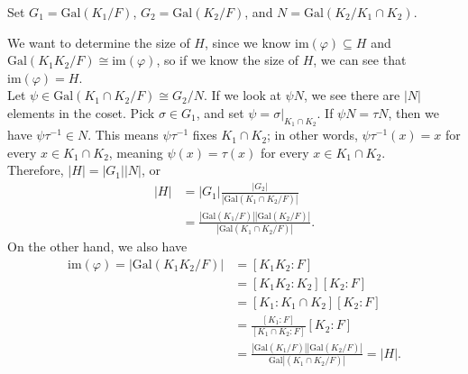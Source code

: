 \documentclass[10pt]{extarticle}
\begin{document}
  Set $G_1 = \text{Gal}(K_1/F)$, $G_2 = \text{Gal}(K_2/F)$, and $N = \text{Gal}(K_2/K_1\cap K_2)$.
  \begin{center}
  \end{center}
  We want to determine the size of $H$, since we know $\text{im}(\varphi)\subseteq H$ and $\text{Gal}(K_1K_2/F)\cong \text{im}(\varphi)$, so if we know the size of $H$, we can see that $\text{im}(\varphi) = H$.\\

  Let $\psi\in \text{Gal}(K_1\cap K_2/F) \cong G_2/N$. If we look at $\psi N$, we see there are $|N|$ elements in the coset. Pick $\sigma\in G_1$, and set $\psi = \sigma|_{K_1\cap K_2}$. If $\psi N = \tau N$, then we have $\psi \tau^{-1}\in N$. This means $\psi \tau^{-1}$ fixes $K_1\cap K_2$; in other words, $\psi\tau^{-1}(x) = x$ for every $x\in K_1\cap K_2$, meaning $\psi(x) = \tau(x)$ for every $x\in K_1\cap K_2$.\\

  Therefore, $|H| = |G_1||N|$, or
  \begin{align*}
    |H| &= |G_1| \frac{|G_2|}{|\text{Gal}(K_1\cap K_2/F)|}\\
        &= \frac{|\text{Gal}(K_1/F)||\text{Gal}(K_2/F)|}{|\text{Gal}(K_1\cap K_2/F)|}.
  \end{align*}
  On the other hand, we also have
  \begin{align*}
    \text{im}(\varphi) = |\text{Gal}(K_1K_2/F)| &= [K_1K_2:F]\\
                           &= [K_1K_2:K_2][K_2:F]\\
                           &= [K_1:K_1\cap K_2][K_2:F]\\
                           &= \frac{[K_1:F]}{[K_1\cap K_2:F]}[K_2:F]\\
                           &= \frac{|\text{Gal}(K_1/F)||\text{Gal}(K_2/F)|}{\text{Gal}|(K_1\cap K_2/F)|} = |H|.
  \end{align*}
\end{document}
